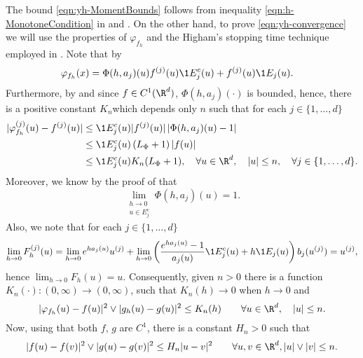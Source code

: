 \begin{pf}
	The bound \eqref{eqn:yh-MomentBounds} follows from inequality \eqref{eqn:h-MonotoneCondition} in
	 and .
	On the other hand, to prove \eqref{eqn:yh-convergence} we will use the properties of 
	$\varphi_{f_h}$ and the Higham's stopping time technique employed in \cite[Thm 2.2]{Higham2002b}. 
	Note that by  
	\begin{align*}
		\varphi_{f_h}(x) 
			&= \Phi(h,a_j)(u) f^{(j)}(u) \1{E_j^c}(u) 
				+ f^{(j)}(u) \1{E_j}(u).
	\end{align*}
	Furthermore, by   and since $f \in C^1(\R^d)$,   $\Phi(h,a_j)(\cdot)$ is bounded,
	hence, there is a positive constant $K_n$which depends only $n$ such that for each $j\in \{1,\dots, d\}$
	\begin{align*}	
		|\varphi_{f_h}^{(j)}(u) - f^{(j)}(u)|
		&\leq
			\1{E_j^c}(u)
			|f^{(j)}(u)|
			\left|
				\Phi(h,a_j)(u) - 1
			\right| \notag \\
		&\leq
			\1{E_j^c}(u)
			\left(
				L_{\Phi} + 1
			\right)
			|f(u)|	 \notag \\
		&\leq
		\1{E_j^c}(u) K_n(L_{\Phi}+1), \quad \forall u \in \R^d, \quad |u|\leq n,  \quad \forall j\in \{1,\dots, d\}.
	\end{align*}
	Moreover, we know by the proof of  that
	\begin{equation*}
	 \lim_{
	 	\substack{
		 	h\to 0 \\
		 	u\in E_j^c	
	 	}
	 }
	 \Phi(h,a_j)(u) = 1.	 	
	\end{equation*}
	Also, we note that for each $j \in \{1, \dots , d\}$
	\begin{equation*}
	\lim_{h \to 0} F_h^{(j)}(u)
		=
		\lim_{h \to 0}
			e^{ha_j(u)} u^{(j)} + 
		\lim_{h \to 0}
			\left(
				\frac{e^{ha_j(u)}-1}{a_j(u)}
				\1{E_j^c}(u)
				+h \1{E_j}(u)
			\right)
			b_j(u^{(j)}) 
		= u^{(j)},
	\end{equation*}
	hence
	$%
		\displaystyle
		\lim_{h\to 0} F_h(u)=u.
	$ %
	Consequently, given $n>0$ there is  a function $K_n(\cdot):(0,\infty)\to (0,\infty)$, such that
	$K_n(h)\to 0$ when $h \to 0$ and
	\begin{equation}\label{eqn:PhihGhKRhBound}
		|\varphi_{f_h}(u)-f(u)|^2 \vee |g_h(u)-g(u)|^2
		\leq K_n(h) \qquad \forall u\in \R^d, \quad |u| \leq n.
	\end{equation}
	Now, using that both $f$, $g$ are $C^{1}$, there is  a constant $H_n>0$ such that
	\begin{equation}\label{eqn:f-gHRBound}
		|f(u)-f(v)|^2 \vee |g(u)-g(v)|^2
		\leq H_n |u-v|^2\qquad \forall u,v \in \R^d, |u|\vee |v| \leq n.
	\end{equation}
	

\end{pf}
